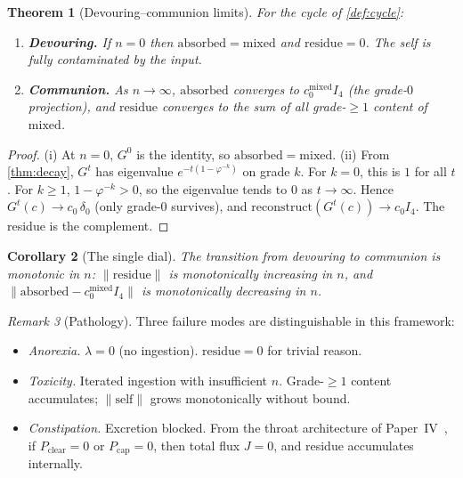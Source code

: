 \documentclass[11pt,a4paper]{article}
\theoremstyle{plain}
\newtheorem{theorem}{Theorem}[section]
\newtheorem{corollary}[theorem]{Corollary}
\theoremstyle{definition}
\theoremstyle{remark}
\newtheorem{remark}[theorem]{Remark}
\numberwithin{equation}{section}
\providecommand{\vp}{\varphi}
\begin{document}
\begin{theorem}[Devouring--communion limits]
\label{thm:dvc-limits}
For the cycle of \cref{def:cycle}:
\begin{enumerate}[label=(\roman*)]
\item \textbf{Devouring.} If $n = 0$ then $\mathrm{absorbed} = \mathrm{mixed}$
  and $\mathrm{residue} = 0$. The self is fully contaminated by the
  input.
\item \textbf{Communion.} As $n \to \infty$, $\mathrm{absorbed}$
  converges to $c_0^{\mathrm{mixed}} I_4$ (the grade-$0$
  projection), and $\mathrm{residue}$ converges to the sum of all
  grade-$\geq 1$ content of $\mathrm{mixed}$.
\end{enumerate}
\end{theorem}

\begin{proof}
(i) At $n = 0$, $G^0$ is the identity, so $\mathrm{absorbed} = \mathrm{mixed}$.
(ii) From \cref{thm:decay}, $G^t$ has eigenvalue $e^{-t(1-\vp^{-k})}$
on grade $k$. For $k = 0$, this is $1$ for all $t$. For $k \geq 1$,
$1 - \vp^{-k} > 0$, so the eigenvalue tends to $0$ as $t \to \infty$.
Hence $G^t(c) \to c_0 \, \delta_0$ (only grade-$0$ survives), and
$\mathrm{reconstruct}(G^t(c)) \to c_0 I_4$. The residue is the
complement.
\end{proof}

\begin{corollary}[The single dial]
The transition from devouring to communion is monotonic in $n$:
$\|\mathrm{residue}\|$ is monotonically increasing in $n$, and
$\|\mathrm{absorbed} - c_0^{\mathrm{mixed}} I_4\|$ is monotonically
decreasing in $n$.
\end{corollary}

\begin{remark}[Pathology]
Three failure modes are distinguishable in this framework:
\begin{itemize}
\item \emph{Anorexia.} $\lambda = 0$ (no ingestion).
  $\mathrm{residue} = 0$ for trivial reason.
\item \emph{Toxicity.} Iterated ingestion with insufficient $n$.
  Grade-$\geq 1$ content accumulates; $\|\mathrm{self}\|$ grows
  monotonically without bound.
\item \emph{Constipation.} Excretion blocked.   From the throat
  architecture of Paper~IV~\cite{paper-IV}, if $P_\mathrm{clear} = 0$
  or $P_\mathrm{cap} = 0$, then total flux $J = 0$, and residue
  accumulates internally.
\end{itemize}
\end{remark}
\end{document}

